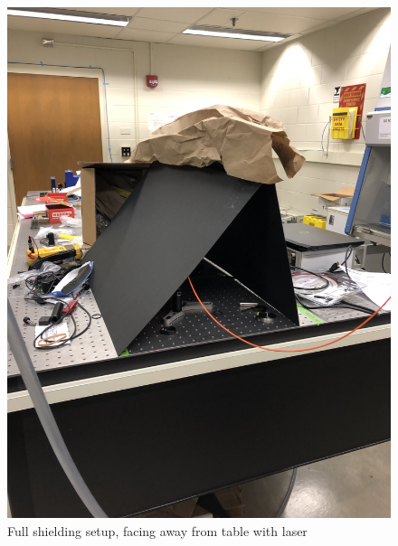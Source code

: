 \documentclass[a4paper]{article}
\begin{document}

\begin{figure}
\centering
\includegraphics[angle=270,origin=c,width=\textwidth]{figures/IMG_6135.jpg}
\caption{\label{fig:fiber_shielded_front}Full shielding setup, facing away from table with laser}
\end{figure}
\end{document}
